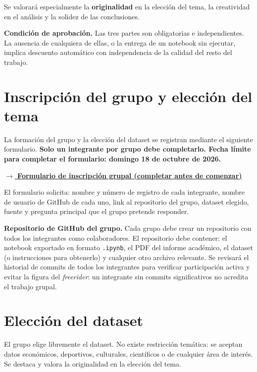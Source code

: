 \documentclass[11pt,a4paper]{article}
\newcommand{\FechaFormulario}{domingo 18 de octubre de 2026}
\newcommand{\LinkFormulario}{https://docs.google.com/forms/d/e/1FAIpQLScICVFXNGVzvuIHZRwseWbs7Jhze_a4pDw_mYV0V805u7bXLQ/viewform?usp=dialog}
\begin{document}
Se valorará especialmente la \textbf{originalidad} en la elección del tema, la creatividad en el análisis y
la solidez de las conclusiones.

\begin{nota}
\textbf{Condición de aprobación.} Las tres partes son obligatorias e independientes. La ausencia
de cualquiera de ellas, o la entrega de un notebook sin ejecutar, implica descuento automático
con independencia de la calidad del resto del trabajo.
\end{nota}

\section{Inscripción del grupo y elección del tema}
La formación del grupo y la elección del dataset se registran mediante el siguiente formulario.
\textbf{Solo un integrante por grupo debe completarlo. Fecha límite para completar el formulario:
\FechaFormulario.}

\begin{center}
\href{\LinkFormulario}{\bfseries $\rightarrow$ Formulario de inscripción grupal (completar antes de comenzar)}
\end{center}

El formulario solicita: nombre y número de registro de cada integrante, nombre de usuario de
GitHub de cada uno, link al repositorio del grupo, dataset elegido, fuente y pregunta principal
que el grupo pretende responder.

\begin{nota}
\textbf{Repositorio de GitHub del grupo.} Cada grupo debe crear un repositorio con todos
los integrantes como colaboradores. El repositorio debe contener: el notebook exportado en
formato \texttt{.ipynb}, el PDF del informe académico, el dataset (o instrucciones para obtenerlo)
y cualquier otro archivo relevante. Se revisará el historial de commits de todos los
integrantes para verificar participación activa y evitar la figura del \emph{freerider}: un integrante
sin commits significativos no acredita el trabajo grupal.
\end{nota}

\section{Elección del dataset}
El grupo elige libremente el dataset. No existe restricción temática: se aceptan datos económicos,
deportivos, culturales, científicos o de cualquier área de interés. Se destaca y valora la
originalidad en la elección del tema.
\end{document}
